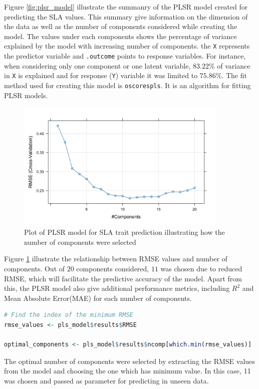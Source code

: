 \documentclass[12pt,a4paper]{report}
\begin{document}
Figure \ref{fig:plsr_model} illustrate the summanry of the PLSR model created for predicting the SLA values. This summary give information on the dimension of the data as well as the number of components considered while creating the model. The values under each components shows the percentage of variance explained by the model with increasing number of components. the \texttt{X} represents the predictor variable and \texttt{.outcome} points to response variables. For instance, when considering only one component or one latent variable, $83.22$\%  of variance in \texttt{X} is explained and for response (\texttt{Y}) variable it was limited to $75.86$\%. The fit method used for creating this model is \texttt{oscorespls}. It is an algorithm for fitting PLSR models. 

\begin{figure}[h]
    \centering
    \includegraphics[width=0.9\textwidth]{Figures/plsr_sla_model.png}
    \caption{Plot of PLSR model for SLA trait prediction illustrating how the number of components were selected}
    \label{fig:plsr_sla_model}
\end{figure}

Figure \ref{fig:plsr_sla_model} illustrate the relationship between RMSE values and number of components. Out of $20$ components considered, $11$ was chosen due to reduced RMSE, which will facilitate the predictive accuracy of the model. Apart from this, the PLSR model also give additional performance metrics, including $R^2$ and Mean Absolute Error(MAE) for each number of components. \\

\begin{lstlisting}[language=R, style=mystyle]
# Find the index of the minimum RMSE
rmse_values <- pls_model$results$RMSE

optimal_components <- pls_model$results$ncomp[which.min(rmse_values)]
\end{lstlisting}
The optimal number of components were selected by extracting the RMSE values from the model and choosing the one which has minimum value. In this case, 11 was chosen and passed as parameter for predicting in unseen data.
\end{document}
